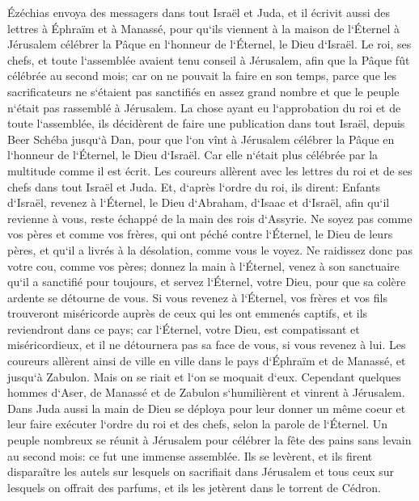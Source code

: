 \verse Ézéchias envoya des messagers dans tout Israël et Juda, et il écrivit aussi des lettres à Éphraïm et à Manassé, pour qu`ils viennent à la maison de l`Éternel à Jérusalem célébrer la Pâque en l`honneur de l`Éternel, le Dieu d`Israël. 
\verse Le roi, ses chefs, et toute l`assemblée avaient tenu conseil à Jérusalem, afin que la Pâque fût célébrée au second mois; 
\verse car on ne pouvait la faire en son temps, parce que les sacrificateurs ne s`étaient pas sanctifiés en assez grand nombre et que le peuple n`était pas rassemblé à Jérusalem. 
\verse La chose ayant eu l`approbation du roi et de toute l`assemblée, 
\verse ils décidèrent de faire une publication dans tout Israël, depuis Beer Schéba jusqu`à Dan, pour que l`on vînt à Jérusalem célébrer la Pâque en l`honneur de l`Éternel, le Dieu d`Israël. Car elle n`était plus célébrée par la multitude comme il est écrit. 
\verse Les coureurs allèrent avec les lettres du roi et de ses chefs dans tout Israël et Juda. Et, d`après l`ordre du roi, ils dirent: Enfants d`Israël, revenez à l`Éternel, le Dieu d`Abraham, d`Isaac et d`Israël, afin qu`il revienne à vous, reste échappé de la main des rois d`Assyrie. 
\verse Ne soyez pas comme vos pères et comme vos frères, qui ont péché contre l`Éternel, le Dieu de leurs pères, et qu`il a livrés à la désolation, comme vous le voyez. 
\verse Ne raidissez donc pas votre cou, comme vos pères; donnez la main à l`Éternel, venez à son sanctuaire qu`il a sanctifié pour toujours, et servez l`Éternel, votre Dieu, pour que sa colère ardente se détourne de vous. 
\verse Si vous revenez à l`Éternel, vos frères et vos fils trouveront miséricorde auprès de ceux qui les ont emmenés captifs, et ils reviendront dans ce pays; car l`Éternel, votre Dieu, est compatissant et miséricordieux, et il ne détournera pas sa face de vous, si vous revenez à lui. 
\verse Les coureurs allèrent ainsi de ville en ville dans le pays d`Éphraïm et de Manassé, et jusqu`à Zabulon. Mais on se riait et l`on se moquait d`eux. 
\verse Cependant quelques hommes d`Aser, de Manassé et de Zabulon s`humilièrent et vinrent à Jérusalem. 
\verse Dans Juda aussi la main de Dieu se déploya pour leur donner un même coeur et leur faire exécuter l`ordre du roi et des chefs, selon la parole de l`Éternel. 
\verse Un peuple nombreux se réunit à Jérusalem pour célébrer la fête des pains sans levain au second mois: ce fut une immense assemblée. 
\verse Ils se levèrent, et ils firent disparaître les autels sur lesquels on sacrifiait dans Jérusalem et tous ceux sur lesquels on offrait des parfums, et ils les jetèrent dans le torrent de Cédron. 

